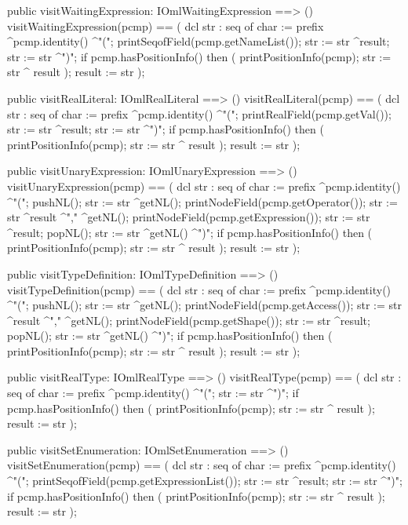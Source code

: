 \begin{vdm_al}
  public visitWaitingExpression: IOmlWaitingExpression ==> ()
  visitWaitingExpression(pcmp) ==
    ( dcl str : seq of char := prefix ^pcmp.identity() ^"(";
      printSeqofField(pcmp.getNameList());
      str := str ^result;
      str := str ^")";
      if pcmp.hasPositionInfo()
      then ( printPositionInfo(pcmp);
             str := str ^ result );
      result := str );

  public visitRealLiteral: IOmlRealLiteral ==> ()
  visitRealLiteral(pcmp) ==
    ( dcl str : seq of char := prefix ^pcmp.identity() ^"(";
      printRealField(pcmp.getVal());
      str := str ^result;
      str := str ^")";
      if pcmp.hasPositionInfo()
      then ( printPositionInfo(pcmp);
             str := str ^ result );
      result := str );

  public visitUnaryExpression: IOmlUnaryExpression ==> ()
  visitUnaryExpression(pcmp) ==
    ( dcl str : seq of char := prefix ^pcmp.identity() ^"(";
      pushNL();
      str := str ^getNL();
      printNodeField(pcmp.getOperator());
      str := str ^result ^"," ^getNL();
      printNodeField(pcmp.getExpression());
      str := str ^result;
      popNL();
      str := str ^getNL() ^")";
      if pcmp.hasPositionInfo()
      then ( printPositionInfo(pcmp);
             str := str ^ result );
      result := str );

  public visitTypeDefinition: IOmlTypeDefinition ==> ()
  visitTypeDefinition(pcmp) ==
    ( dcl str : seq of char := prefix ^pcmp.identity() ^"(";
      pushNL();
      str := str ^getNL();
      printNodeField(pcmp.getAccess());
      str := str ^result ^"," ^getNL();
      printNodeField(pcmp.getShape());
      str := str ^result;
      popNL();
      str := str ^getNL() ^")";
      if pcmp.hasPositionInfo()
      then ( printPositionInfo(pcmp);
             str := str ^ result );
      result := str );

  public visitRealType: IOmlRealType ==> ()
  visitRealType(pcmp) ==
    ( dcl str : seq of char := prefix ^pcmp.identity() ^"(";
      str := str ^")";
      if pcmp.hasPositionInfo()
      then ( printPositionInfo(pcmp);
             str := str ^ result );
      result := str );

  public visitSetEnumeration: IOmlSetEnumeration ==> ()
  visitSetEnumeration(pcmp) ==
    ( dcl str : seq of char := prefix ^pcmp.identity() ^"(";
      printSeqofField(pcmp.getExpressionList());
      str := str ^result;
      str := str ^")";
      if pcmp.hasPositionInfo()
      then ( printPositionInfo(pcmp);
             str := str ^ result );
      result := str );


\end{vdm_al}
